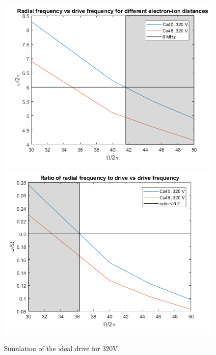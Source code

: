 \begin{figure}[h]
	\centering
	\includegraphics[width=\textwidth]{images/320V_left}
	\includegraphics[width=\textwidth]{images/320V_right}
	\label{fig:ideal_drive_320}
	\caption{Simulation of the ideal drive for 320V}
\end{figure}
\FloatBarrier
